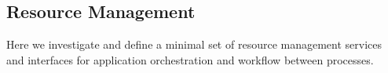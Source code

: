 
\subsection{Resource Management}
\label{sec:resources}

Here we investigate and define a minimal set of resource management
services and interfaces for application orchestration and workflow
between processes.
